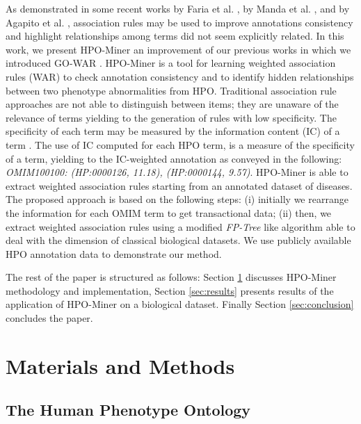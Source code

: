 \documentclass{article}
\theoremstyle{definition}
\begin{document}
As demonstrated in some recent works by Faria et al. \cite{faria2012}, by Manda et al. \cite{manda2013interestingness}, and by Agapito et al. \cite{agapito2014improving,agapito2015using},  association rules may be used to improve annotations consistency and highlight relationships among terms did not seem explicitly related. In this work, we present HPO-Miner an improvement of our previous works in which we introduced GO-WAR \cite{agapito2015using}. HPO-Miner is a tool for learning weighted association rules (WAR) to check annotation consistency and to identify hidden relationships between two phenotype abnormalities from HPO.
Traditional association rule approaches are not able to distinguish between items; they are unaware of the relevance of terms yielding to the generation of rules with low specificity. The specificity of each term may be measured by the information content (IC) of a term \cite{harispe2013framework}. The use of IC computed for each HPO term, is a measure of the specificity of a term, yielding to the IC-weighted annotation as conveyed in the following: \textit{OMIM100100: (HP:0000126, 11.18), (HP:0000144, 9.57)}.
HPO-Miner is able to extract weighted association rules starting from an annotated dataset of diseases. The proposed approach is based on the following steps: (i) initially we rearrange the information for each OMIM term to get transactional data; (ii) then, we extract weighted association rules using a modified \textit{FP-Tree} like algorithm able to deal with the dimension of classical biological datasets. We use publicly available HPO annotation data to demonstrate our method. 


The rest of the paper is structured as follows:  Section \ref{sec:methods} discusses HPO-Miner methodology and implementation, Section \ref{sec:results} presents results of the application of HPO-Miner on a biological dataset. Finally Section \ref{sec:conclusion} concludes the paper.



\section{Materials and Methods}
\label{sec:methods}

\subsection{The Human Phenotype Ontology}
\end{document}
